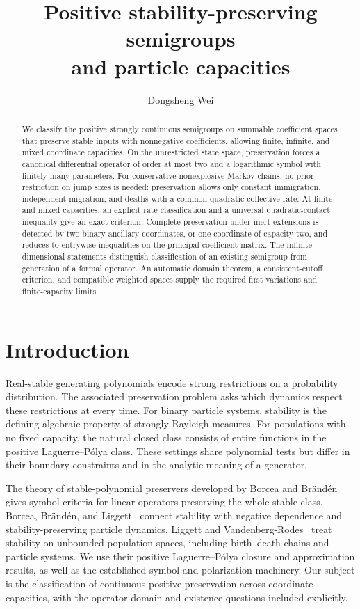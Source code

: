 \documentclass[reqno]{amsart}
\title[Positive stability semigroups and capacities]{Positive stability-preserving semigroups\\ and particle capacities}
\author{Dongsheng Wei}
\date{}
\theoremstyle{definition}
\theoremstyle{remark}
\begin{document}
\begin{abstract}
We classify the positive strongly continuous semigroups on summable
coefficient spaces that preserve stable inputs with nonnegative
coefficients, allowing finite, infinite, and mixed coordinate capacities.
On the unrestricted state
space, preservation forces a canonical differential operator of order
at most two and a logarithmic symbol with finitely many parameters.
For conservative nonexplosive Markov chains, no prior restriction on
jump sizes is needed: preservation allows only constant immigration,
independent migration, and deaths with a common quadratic collective
rate. At finite and mixed capacities, an explicit rate classification
and a universal quadratic-contact inequality give an exact criterion.
Complete preservation under inert extensions is detected by two binary
ancillary coordinates, or one coordinate of capacity two, and reduces
to entrywise inequalities on the principal coefficient matrix. The
infinite-dimensional statements distinguish classification of an
existing semigroup from generation of a formal operator. An automatic
domain theorem, a consistent-cutoff criterion, and compatible weighted
spaces supply the required first variations and finite-capacity limits.
\end{abstract}
\maketitle
\tableofcontents
\section{Introduction}

Real-stable generating polynomials encode strong restrictions on a
probability distribution. The associated preservation problem asks
which dynamics respect these restrictions at every time. For binary
particle systems, stability is the defining algebraic property of
strongly Rayleigh measures. For populations with no fixed capacity,
the natural closed class consists of entire functions in the positive
Laguerre--P\'olya class. These settings share polynomial tests but differ
in their boundary constraints and in the analytic meaning of a
generator.

The theory of stable-polynomial preservers developed by Borcea and
Br\"and\'en~\cite{BB09,BB10,BB10II} gives symbol criteria for linear
operators preserving the whole stable class. Borcea, Br\"and\'en, and
Liggett~\cite{BBL09} connect stability with negative dependence and
stability-preserving particle dynamics. Liggett and
Vandenberg-Rodes~\cite{LVR10} treat stability on unbounded population
spaces, including birth--death chains and particle systems. We use
their positive Laguerre--P\'olya closure and approximation results, as
well as the established symbol and polarization machinery. Our subject
is the classification of continuous positive preservation across
coordinate capacities, with the operator domain and existence questions
included explicitly.
\end{document}
